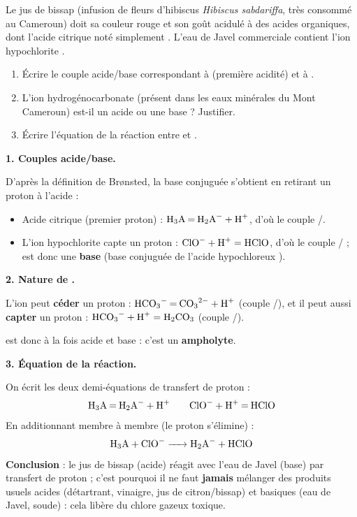 \documentclass[11pt]{article}
\begin{document}
\begin{exoresolu}
Le jus de bissap (infusion de fleurs d'hibiscus \emph{Hibiscus sabdariffa}, très consommé au Cameroun) doit sa couleur rouge et son goût acidulé à des acides organiques, dont l'acide citrique noté simplement . L'eau de Javel commerciale contient l'ion hypochlorite .
\begin{enumerate}
\item Écrire le couple acide/base correspondant à  (première acidité) et à .
\item L'ion hydrogénocarbonate  (présent dans les eaux minérales du Mont Cameroun) est-il un acide ou une base ? Justifier.
\item Écrire l'équation de la réaction entre  et .
\end{enumerate}
\tcblower
\textbf{1. Couples acide/base.}

D'après la définition de Brønsted, la base conjuguée s'obtient en retirant un proton  à l'acide :
\begin{itemize}
\item Acide citrique (premier proton) : $\ce{H3A = H2A- + H+}$, d'où le couple /.
\item L'ion hypochlorite capte un proton : $\ce{ClO-} + \ce{H+} = \ce{HClO}$, d'où le couple / ;  est donc une \textbf{base} (base conjuguée de l'acide hypochloreux ).
\end{itemize}

\textbf{2. Nature de .}

L'ion  peut \textbf{céder} un proton : $\ce{HCO3- = CO3^2- + H+}$ (couple /), et il peut aussi \textbf{capter} un proton : $\ce{HCO3-} + \ce{H+} = \ce{H2CO3}$ (couple /).

 est donc à la fois acide et base : c'est un \textbf{ampholyte}.

\textbf{3. Équation de la réaction.}

On écrit les deux demi-équations de transfert de proton :
\[ \ce{H3A = H2A- + H+} \qquad \ce{ClO- + H+ = HClO} \]
En additionnant membre à membre (le proton  s'élimine) :
\[ \ce{H3A + ClO- -> H2A- + HClO} \]
\textbf{Conclusion} : le jus de bissap (acide) réagit avec l'eau de Javel (base) par transfert de proton ; c'est pourquoi il ne faut \textbf{jamais} mélanger des produits usuels acides (détartrant, vinaigre, jus de citron/bissap) et basiques (eau de Javel, soude) : cela libère du chlore gazeux  toxique.
\end{exoresolu}
\end{document}
